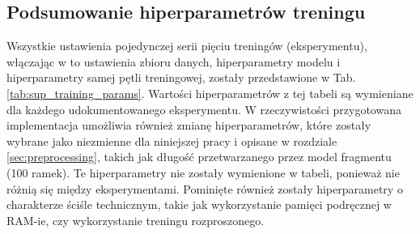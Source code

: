 \subsection{Podsumowanie hiperparametrów treningu}

Wszystkie ustawienia pojedynczej serii pięciu treningów (eksperymentu), włączając w to ustawienia zbioru danych, hiperparametry modelu i hiperparametry samej pętli treningowej, zostały przedstawione w Tab. \ref{tab:sup_training_params}. Wartości hiperparametrów z tej tabeli są wymieniane dla każdego udokumentowanego eksperymentu. W rzeczywistości przygotowana implementacja umożliwia również zmianę hiperparametrów, które zostały wybrane jako niezmienne dla niniejszej pracy i opisane w rozdziale \ref{sec:preprocessing}, takich jak długość przetwarzanego przez model fragmentu (100 ramek). Te hiperparametry nie zostały wymienione w tabeli, ponieważ nie różnią się między eksperymentami. Pominięte również zostały hiperparametry o charakterze ściśle technicznym, takie jak wykorzystanie pamięci podręcznej w RAM-ie, czy wykorzystanie treningu rozproszonego.


